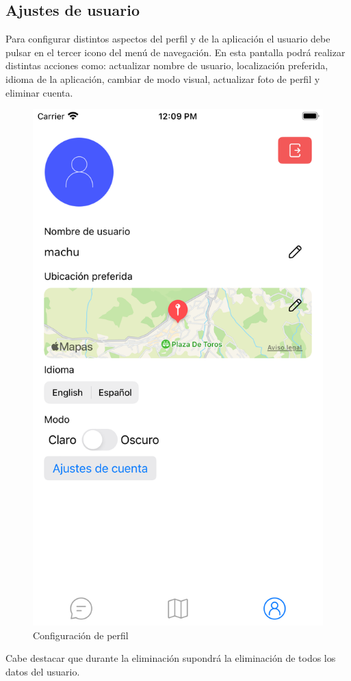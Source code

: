 \begin{appendices}
\section{Ajustes de usuario}
Para configurar distintos aspectos del perfil y de la aplicación el usuario debe pulsar en el tercer icono del menú de navegación. En esta pantalla podrá realizar distintas acciones como: actualizar nombre de usuario, localización preferida, idioma de la aplicación, cambiar de modo visual, actualizar foto de perfil y eliminar cuenta.
\begin{figure}[H]
        \centering
        \includegraphics[cframe=black 2pt,width=0.3\linewidth]{images/manual/confPerfil.png}
        \caption{Configuración de perfil}
        \label{fig:user_settings}
\end{figure}
Cabe destacar que durante la eliminación supondrá la eliminación de todos los datos del usuario.


\end{appendices}
